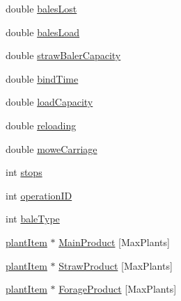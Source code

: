 \begin{DoxyCompactItemize}
\item 
double \hyperlink{classharvest_tech_a6287a8add3f5b707b42a6565ecc67d87}{balesLost}
\item 
double \hyperlink{classharvest_tech_a57a9eef8f134eb29850e764f16249fcf}{balesLoad}
\item 
double \hyperlink{classharvest_tech_a1b368e19b6f1bbd519b9c263168011f0}{strawBalerCapacity}
\item 
double \hyperlink{classharvest_tech_ac27e8d47de57e3eac8c8e2c018a30ac9}{bindTime}
\item 
double \hyperlink{classharvest_tech_a596bf2f645408dba4cf16d4c020ebe54}{loadCapacity}
\item 
double \hyperlink{classharvest_tech_a80df64e4f1a1a350d9417442f5a1fde2}{reloading}
\item 
double \hyperlink{classharvest_tech_a65e2dcf017abd9238c0146d7e46bf631}{moweCarriage}
\item 
int \hyperlink{classharvest_tech_a17ee58d74bbafc0c067cd16a69769a08}{stops}
\item 
int \hyperlink{classharvest_tech_ad551ccd676b1a6078f1447eb15e60064}{operationID}
\item 
int \hyperlink{classharvest_tech_ac17112c92ad4a22487df2fd5d3fc6c18}{baleType}
\item 
\hyperlink{classplant_item}{plantItem} $\ast$ \hyperlink{classharvest_tech_adcf86d0ccb7f92d9e5ecbe6e5a8ed3bc}{MainProduct} \mbox{[}MaxPlants\mbox{]}
\item 
\hyperlink{classplant_item}{plantItem} $\ast$ \hyperlink{classharvest_tech_a390dbcd08cb961378c244a52b550bd70}{StrawProduct} \mbox{[}MaxPlants\mbox{]}
\item 
\hyperlink{classplant_item}{plantItem} $\ast$ \hyperlink{classharvest_tech_a55a5dcd524da7e4e3f5eef68b60fec91}{ForageProduct} \mbox{[}MaxPlants\mbox{]}
\end{DoxyCompactItemize}


